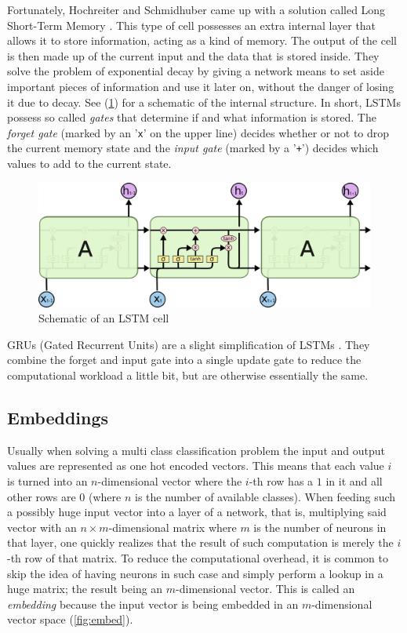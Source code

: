     Fortunately, Hochreiter and Schmidhuber came up with a solution called
    Long Short-Term Memory \cite{lstm}.  This type of cell possesses an
    extra internal layer that allows it to store information, acting as a
    kind of memory. The output of the cell is then made up of the current
    input and the data that is stored inside. They solve the problem of
    exponential decay by giving a network means to set aside important
    pieces of information and use it later on, without the danger of
    losing it due to decay.  See (\ref{fig:lstm}) for a schematic of the
    internal structure. In short, LSTMs possess so called \textit{gates}
    that determine if and what information is stored. The \textit{forget
    gate} (marked by an '\verb+x+' on the upper line) decides whether or not
    to drop the current memory state and the \textit{input gate} (marked
    by a '\verb|+|') decides which values to add to the current state.

    \begin{figure}
    \begin{center}
        \includegraphics[width=0.9 \linewidth]{lstm.png}
    \end{center}
        \caption{Schematic of an LSTM cell \cite{colah}}
    \label{fig:lstm}
    \end{figure}

	GRUs (Gated Recurrent Units) are a slight simplification of LSTMs \cite{gru}. They
	combine the forget and input gate into a single update gate to reduce the computational workload
	a little bit, but are otherwise essentially the same.
    

  \subsection{Embeddings}
  \label{sub:embeddings}
  
    Usually when solving a multi class classification problem the input and output values are
	represented as one hot encoded vectors. This means that each value $i$ is turned into an
	$n$-dimensional vector where the $i$-th row has a $1$ in it and all other rows are $0$ (where
	$n$ is the number of available classes). When feeding such a possibly huge input vector
	into a layer of a network, that is, multiplying said vector with an $n \times m$-dimensional
	matrix where $m$ is the number of neurons in that layer, one quickly realizes that the result
	of such computation is merely the $i$-th row of that matrix. To reduce the computational
	overhead, it is common to skip the idea of having neurons in such case and simply perform
	a lookup in a huge matrix; the result being an $m$-dimensional vector. This is called an
    \textit{embedding} because the input vector is being embedded in an $m$-dimensional vector space (\ref{fig:embed}).

